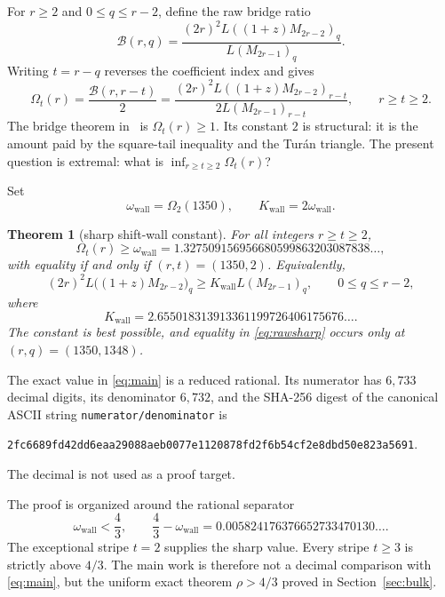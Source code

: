 \documentclass[11pt,a4paper]{article}
\theoremstyle{plain}
\newtheorem{theorem}{Theorem}[section]
\theoremstyle{remark}
\newcommand{\Omw}{\omega_{\mathrm{wall}}}
\newcommand{\Kw}{K_{\mathrm{wall}}}
\begin{document}
For $r\ge2$ and $0\le q\le r-2$, define the raw bridge ratio
\[
 \mathcal B(r,q)=
 \frac{(2r)^2L((1+z)M_{2r-2})_q}{L(M_{2r-1})_q}.
\]
Writing $t=r-q$ reverses the coefficient index and gives
\begin{equation}\label{eq:Omega}
 \Omega_t(r)=\frac{\mathcal B(r,r-t)}2
 =\frac{(2r)^2L((1+z)M_{2r-2})_{r-t}}
        {2L(M_{2r-1})_{r-t}},
 \qquad r\ge t\ge2.
\end{equation}
The bridge theorem in~\cite{squaretail} is $\Omega_t(r)\ge1$.  Its constant
$2$ is structural: it is the amount paid by the square-tail inequality and
the Tur\'an triangle.  The present question is extremal: what is
$\inf_{r\ge t\ge2}\Omega_t(r)$?

Set
\begin{equation}\label{eq:constants}
 \Omw=\Omega_2(1350),\qquad \Kw=2\Omw.
\end{equation}

\begin{theorem}[sharp shift-wall constant]\label{thm:main}
For all integers $r\ge t\ge2$,
\begin{equation}\label{eq:main}
 \Omega_t(r)\ge\Omw
 =1.327509156956680599863203087838\ldots,
\end{equation}
with equality if and only if $(r,t)=(1350,2)$.  Equivalently,
\begin{equation}\label{eq:rawsharp}
 (2r)^2L\bigl((1+z)M_{2r-2}\bigr)_q
 \ge \Kw L(M_{2r-1})_q,
 \qquad 0\le q\le r-2,
\end{equation}
where
\[
 \Kw=2.655018313913361199726406175676\ldots.
\]
The constant is best possible, and equality in \eqref{eq:rawsharp} occurs
only at $(r,q)=(1350,1348)$.
\end{theorem}

The exact value in \eqref{eq:main} is a reduced rational.  Its numerator has
$6{,}733$ decimal digits, its denominator $6{,}732$, and the SHA-256 digest of
the canonical ASCII string \texttt{numerator/denominator} is
\begin{center}
\texttt{2fc6689fd42dd6eaa29088aeb0077e1120878fd2f6b54cf2e8dbd50e823a5691}.
\end{center}
The decimal is not used as a proof target.

The proof is organized around the rational separator
\begin{equation}\label{eq:separator}
 \Omw<\frac43,
 \qquad
 \frac43-\Omw
 =0.005824176376652733470130\ldots.
\end{equation}
The exceptional stripe $t=2$ supplies the sharp value.  Every stripe $t\ge3$
is strictly above $4/3$.  The main work is therefore not a decimal comparison
with \eqref{eq:main}, but the uniform exact theorem $\rho>4/3$ proved in
Section~\ref{sec:bulk}.
\end{document}
